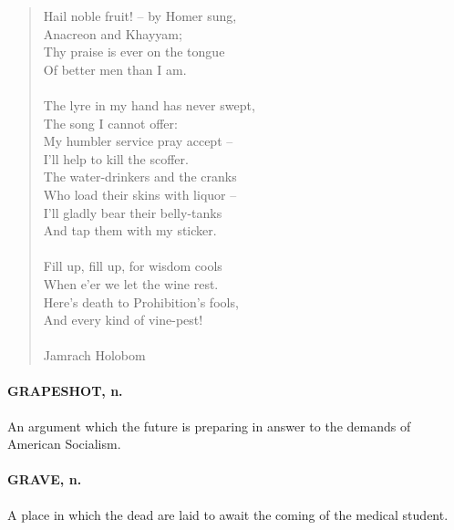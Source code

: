 \documentclass[11pt]{article}
\begin{document}
\begin{quote}   Hail noble fruit! -- by Homer sung, \\
      Anacreon and Khayyam; \\
  Thy praise is ever on the tongue \\
      Of better men than I am. \\
 \\
  The lyre in my hand has never swept, \\
      The song I cannot offer: \\
  My humbler service pray accept -- \\
      I'll help to kill the scoffer. \\
  The water-drinkers and the cranks \\
      Who load their skins with liquor -- \\
  I'll gladly bear their belly-tanks \\
      And tap them with my sticker. \\
 \\
  Fill up, fill up, for wisdom cools \\
      When e'er we let the wine rest. \\
  Here's death to Prohibition's fools, \\
      And every kind of vine-pest! \\
 \\
Jamrach Holobom \end{quote}


\paragraph{GRAPESHOT, n.}  An argument which the future is preparing in answer to
the demands of American Socialism.

\paragraph{GRAVE, n.}  A place in which the dead are laid to await the coming of
the medical student.
\end{document}
